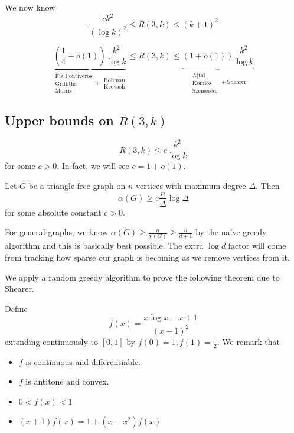 \documentclass{article}
\begin{document}
We now know
$$\frac{ck^2}{(\log k)^2} \le R(3, k) \le (k + 1)^2$$

\begin{thm}
  $$\underbrace{\left(\frac 14 + o(1)\right)\frac{k^2}{\log k}}_{\substack{\text{Fiz Pontiveros} \\ \text{Griffiths} \\ \text{Morris}} + \substack{\text{Bohman} \\ \text{Keevash}}} \le R(3, k) \le \underbrace{(1 + o(1))\frac{k^2}{\log k}}_{\substack{\text{Ajtai} \\ \text{Komlós} \\ \text{Szemerédi}} + \text{Shearer}}$$
\end{thm}

\clearpage

\subsection{Upper bounds on \texorpdfstring{$R(3, k)$}{R(3, k)}}

\newlec

\begin{thm}
  $$R(3, k) \le c \frac{k^2}{\log k}$$
  for some $c > 0$. In fact, we will see $c = 1 + o(1)$.
\end{thm}

\begin{thm}
  Let $G$ be a triangle-free graph on $n$ vertices with maximum degree $\Delta$. Then
  $$\alpha(G) \ge c \frac n\Delta \log\Delta$$
  for some absolute constant $c > 0$.
\end{thm}

\begin{rmk}
  For general graphs, we know $\alpha(G) \ge \frac n{\chi(G)} \ge \frac n{d + 1}$ by the naïve greedy algorithm and this is basically best possible. The extra $\log d$ factor will come from tracking how sparse our graph is becoming as we remove vertices from it.
\end{rmk}

We apply a random greedy algorithm to prove the following theorem due to Shearer.

Define
$$f(x) = \frac{x \log x - x + 1}{(x - 1)^2}$$
extending continuously to $[0, 1]$ by $f(0) = 1, f(1) = \frac 12$. We remark that
\begin{itemize}
  \item $f$ is continuous and differentiable.
  \item $f$ is antitone and convex.
  \item $0 < f(x) < 1$
  \item $(x + 1)f(x) = 1 + (x - x^2)f(x)$
\end{itemize}
\end{document}
